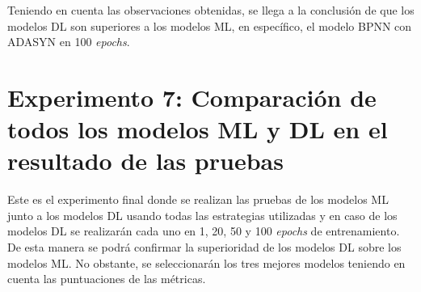 Teniendo en cuenta las observaciones obtenidas, se llega a la conclusi\'{o}n de que los modelos DL son superiores a los modelos ML, en espec\'{i}fico, el modelo BPNN con ADASYN en 100 \textit{epochs}.

\section{Experimento 7: Comparaci\'{o}n de todos los modelos ML y DL en el resultado de las pruebas}

  Este es el experimento final donde se realizan las pruebas de los modelos ML junto a los modelos DL usando todas las estrategias utilizadas y en caso de los modelos DL se realizar\'{a}n cada uno en 1, 20, 50 y 100 \textit{epochs} de entrenamiento. De esta manera se podr\'{a} confirmar la superioridad de los modelos DL sobre los modelos ML. No obstante, se seleccionar\'{a}n los tres mejores modelos teniendo en cuenta las puntuaciones de las m\'{e}tricas.
  
